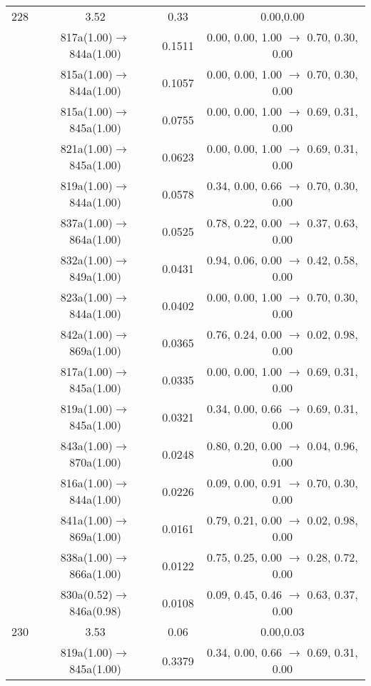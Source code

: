 \documentclass[10pt,a4paper]{article}
\begin{document}
\begin{longtable}{c|c|c|c}
 \hline228 &	 3.52 &	 0.33 &	 0.00,0.00 \\ 
  	& 817a(1.00)$\rightarrow$844a(1.00) &	 0.1511 &	 0.00, 0.00, 1.00 $\rightarrow$ 0.70, 0.30, 0.00 \\ 
 	& 815a(1.00)$\rightarrow$844a(1.00) &	 0.1057 &	 0.00, 0.00, 1.00 $\rightarrow$ 0.70, 0.30, 0.00 \\ 
 	& 815a(1.00)$\rightarrow$845a(1.00) &	 0.0755 &	 0.00, 0.00, 1.00 $\rightarrow$ 0.69, 0.31, 0.00 \\ 
 	& 821a(1.00)$\rightarrow$845a(1.00) &	 0.0623 &	 0.00, 0.00, 1.00 $\rightarrow$ 0.69, 0.31, 0.00 \\ 
 	& 819a(1.00)$\rightarrow$844a(1.00) &	 0.0578 &	 0.34, 0.00, 0.66 $\rightarrow$ 0.70, 0.30, 0.00 \\ 
 	& 837a(1.00)$\rightarrow$864a(1.00) &	 0.0525 &	 0.78, 0.22, 0.00 $\rightarrow$ 0.37, 0.63, 0.00 \\ 
 	& 832a(1.00)$\rightarrow$849a(1.00) &	 0.0431 &	 0.94, 0.06, 0.00 $\rightarrow$ 0.42, 0.58, 0.00 \\ 
 	& 823a(1.00)$\rightarrow$844a(1.00) &	 0.0402 &	 0.00, 0.00, 1.00 $\rightarrow$ 0.70, 0.30, 0.00 \\ 
 	& 842a(1.00)$\rightarrow$869a(1.00) &	 0.0365 &	 0.76, 0.24, 0.00 $\rightarrow$ 0.02, 0.98, 0.00 \\ 
 	& 817a(1.00)$\rightarrow$845a(1.00) &	 0.0335 &	 0.00, 0.00, 1.00 $\rightarrow$ 0.69, 0.31, 0.00 \\ 
 	& 819a(1.00)$\rightarrow$845a(1.00) &	 0.0321 &	 0.34, 0.00, 0.66 $\rightarrow$ 0.69, 0.31, 0.00 \\ 
 	& 843a(1.00)$\rightarrow$870a(1.00) &	 0.0248 &	 0.80, 0.20, 0.00 $\rightarrow$ 0.04, 0.96, 0.00 \\ 
 	& 816a(1.00)$\rightarrow$844a(1.00) &	 0.0226 &	 0.09, 0.00, 0.91 $\rightarrow$ 0.70, 0.30, 0.00 \\ 
 	& 841a(1.00)$\rightarrow$869a(1.00) &	 0.0161 &	 0.79, 0.21, 0.00 $\rightarrow$ 0.02, 0.98, 0.00 \\ 
 	& 838a(1.00)$\rightarrow$866a(1.00) &	 0.0122 &	 0.75, 0.25, 0.00 $\rightarrow$ 0.28, 0.72, 0.00 \\ 
 	& 830a(0.52)$\rightarrow$846a(0.98) &	 0.0108 &	 0.09, 0.45, 0.46 $\rightarrow$ 0.63, 0.37, 0.00 \\ 
 \hline230 &	 3.53 &	 0.06 &	 0.00,0.03 \\ 
  	& 819a(1.00)$\rightarrow$845a(1.00) &	 0.3379 &	 0.34, 0.00, 0.66 $\rightarrow$ 0.69, 0.31, 0.00 \\ 

\end{longtable}
\end{document}
